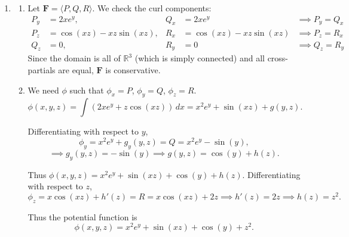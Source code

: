 \documentclass[a4paper, 12pt]{article}
\begin{document}
\begin{enumerate}[leftmargin=*,label=\textbf{\arabic*.}]
\textbf{Case 2: $\lambda = -1$} \\
From \eqref{eq:2025_2026_spring_final_2}, $y = \frac{1}{-1} = -1$.\\
From \eqref{eq:2025_2026_spring_final_1}, $2x(1 - 2(-1)) = 6x = 0 \implies x = 0$.\\
Substituting $x = 0$ and $y = -1$ into \eqref{eq:2025_2026_spring_final_4}: $0 + (-1)^2 + z^2 = 4 \implies z^2 = 3 \implies z = \pm\sqrt{3}$.\\
This gives the points $\left(0, -1, \sqrt{3}\right)$ and $\left(0, -1, -\sqrt{3}\right)$.\\
Evaluating the function:
\[f\left(0, -1, \pm\sqrt{3}\right) = 0^2 + 2(-1) - \left(\pm\sqrt{3}\right)^2 = -2 - 3 = -5.\]

Compare the values evaluated at all critical points.
\[\boxed{\text{Absolute maximum: } 4\text{ at } (0,2,0), \text{ absolute minimum: }{-5}\text{ at }\left(0,-1,\pm\sqrt3\right).}\]

\newpage

\item \begin{enumerate}[leftmargin=*,label=\textbf{\alph*.}]
\item Let $\mathbf{F} = \langle P, Q, R \rangle$. We check the curl components:
\begin{align*}
P_y &= 2xe^y, & Q_x &= 2xe^y &\implies P_y = Q_x \\
P_z &= \cos(xz) - xz\sin(xz), & R_x &= \cos(xz) - xz\sin(xz) &\implies P_z = R_x \\
Q_z &= 0, & R_y &= 0 &\implies Q_z = R_y
\end{align*}
Since the domain is all of $\mathbb{R}^3$ (which is simply connected) and all cross-partials are equal, $\mathbf{F}$ is conservative.

\item We need $\phi$ such that $\phi_x = P$, $\phi_y = Q$, $\phi_z = R$.
\[\phi(x, y, z) = \int (2xe^y + z \cos(xz))\,dx = x^2 e^y + \sin(xz) + g(y, z).\]

Differentiating with respect to $y$,
\[\phi_y = x^2 e^y + g_y(y, z) = Q = x^2 e^y - \sin(y),\]
\[\implies g_y(y, z) = -\sin(y) \implies g(y, z) = \cos(y) + h(z).\]

Thus $\phi(x, y, z) = x^2 e^y + \sin(xz) + \cos(y) + h(z)$. Differentiating with respect to $z$,
\[\phi_z = x \cos(xz) + h'(z) = R = x \cos(xz) + 2z \implies h'(z) = 2z \implies h(z) = z^2.\]

Thus the potential function is
\[\boxed{\phi(x, y, z) = x^2 e^y + \sin(xz) + \cos(y) + z^2}.\]


\end{enumerate}
\end{enumerate}
\end{document}
